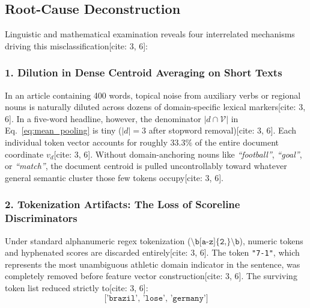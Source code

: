 \documentclass[11pt,a4paper]{article}
\begin{document}
	\subsection{Root-Cause Deconstruction}
	Linguistic and mathematical examination reveals four interrelated mechanisms driving this misclassification[cite: 3, 6]:
	
	\subsubsection{1. Dilution in Dense Centroid Averaging on Short Texts}
	In an article containing 400 words, topical noise from auxiliary verbs or regional nouns is naturally diluted across dozens of domain-specific lexical markers[cite: 3, 6]. In a five-word headline, however, the denominator $|d \cap \mathcal{V}|$ in Eq.~\eqref{eq:mean_pooling} is tiny ($|d|=3$ after stopword removal)[cite: 3, 6]. Each individual token vector accounts for roughly $33.3\%$ of the entire document coordinate $v_d$[cite: 3, 6]. Without domain-anchoring nouns like \textit{``football''}, \textit{``goal''}, or \textit{``match''}, the document centroid is pulled uncontrollably toward whatever general semantic cluster those few tokens occupy[cite: 3, 6].
	
	\subsubsection{2. Tokenization Artifacts: The Loss of Scoreline Discriminators}
	Under standard alphanumeric regex tokenization ($\texttt{\textbackslash b[a-z]\{2,\}\textbackslash b}$), numeric tokens and hyphenated scores are discarded entirely[cite: 3, 6]. The token \texttt{"7-1"}, which represents the most unambiguous athletic domain indicator in the sentence, was completely removed before feature vector construction[cite: 3, 6]. The surviving token list reduced strictly to[cite: 3, 6]:
	\begin{equation*}
		\texttt{['brazil', 'lose', 'germany']}
	\end{equation*}
	
\end{document}
